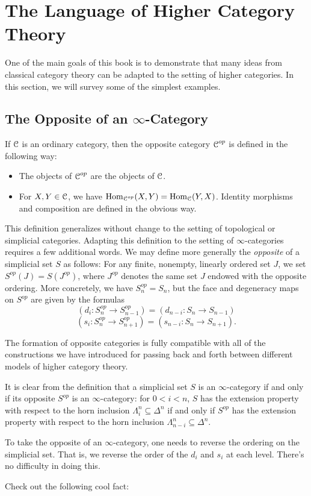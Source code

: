 \section{The Language of Higher Category Theory}\label{langur}


\setcounter{theorem}{0}

One of the main goals of this book is to demonstrate that many ideas from classical category theory can be adapted to the setting of higher categories. In this section, we will survey some of the simplest examples.

\subsection{The Opposite of an $\infty$-Category}\label{working}

If $\operatorname{\mathcal{C}}$ is an ordinary category, then the opposite category
$\operatorname{\mathcal{C}}^{op}$ is defined in the following way:

\begin{itemize}
\item The objects of $\operatorname{\mathcal{C}}^{op}$ are the objects of $\operatorname{\mathcal{C}}$.
\item For $X,Y \in \operatorname{\mathcal{C}}$, we have $\operatorname{Hom}_{\operatorname{\mathcal{C}}^{op}}(X,Y) =
\operatorname{Hom}_{\operatorname{\mathcal{C}}}(Y,X)$. Identity morphisms and composition are defined
in the obvious way.
\end{itemize}

This definition generalizes without change to the setting of topological or simplicial categories. Adapting this definition to the setting of $\infty$-categories requires a few additional words.
We may define more generally the {\it opposite} of a simplicial set
$S$ as follows: For any finite, nonempty, linearly ordered set
$J$, we set $S^{op}(J) = S(J^{op})$, where $J^{op}$ denotes the
same set $J$ endowed with the opposite ordering. More concretely,
we have $S^{op}_n = S_n$, but the face and degeneracy maps on
$S^{op}$ are given by the formulas
$$ (d_i: S^{op}_n \rightarrow S^{op}_{n-1}) = (d_{n-i}: S_n
\rightarrow S_{n-1})$$
$$ (s_i: S^{op}_n \rightarrow S^{op}_{n+1}) = (s_{n-i}: S_n
\rightarrow S_{n+1}).$$

The formation of opposite categories is fully compatible
with all of the constructions we have introduced for passing back
and forth between different models of higher category theory.

It is clear from the definition that a simplicial set $S$ is an $\infty$-category if and only if its opposite $S^{op}$ is an $\infty$-category: for $0 < i < n$, $S$ has the extension property
with respect to the horn inclusion $\Lambda^n_i \subseteq \Delta^n$ if
and only if $S^{op}$ has the extension property with respect to the horn inclusion
$\Lambda^n_{n-i} \subseteq \Delta^n$.
\begin{shaded}
To take the opposite of an $\infty$-category, one needs to reverse the ordering on the simplicial set. That is, we reverse the order of the $d_i$ and $s_i$ at each level. There's no difficulty in doing this.

Check out the following cool fact:
\end{shaded}

